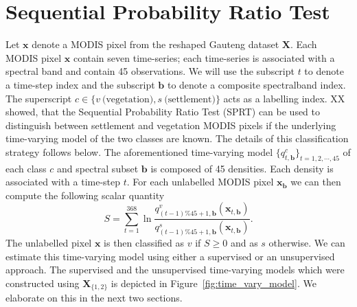 \documentclass{article}
\begin{document}
\section{Sequential Probability Ratio Test}
\label{sec:sprt}
Let $\mathbf{x}$ denote a MODIS pixel from the reshaped Gauteng dataset $\mathbf{X}$. Each MODIS pixel $\mathbf{x}$ contain seven time-series; each time-series is associated with a spectral band and contain 45 observations.
We will use the subscript $t$ to denote a time-step index and the subscript $\mathbf{b}$ to denote a composite spectralband index. The superscript $c\in\{v~\textrm{(vegetation)},s~\textrm{(settlement)}\}$ acts as a labelling index. XX showed, that the Sequential Probability Ratio Test (SPRT) can be used to distinguish between settlement and vegetation MODIS pixels if the underlying time-varying model of the two classes are known. The details of this classification strategy follows below. The aforementioned time-varying model $\{q_{t,\mathbf{b}}^c\}_{t=1,2,\cdots,45}$ of each class $c$ and spectral subset $\mathbf{b}$ is composed of 45 densities. Each density is associated with a time-step $t$. 
For each unlabelled MODIS pixel $\mathbf{x}_{\mathbf{b}}$ we can then compute the following scalar quantity 
\begin{equation}
S = \sum_{t=1}^{368} \ln \frac{q_{(t-1)\%45+1,\mathbf{b}}^v(\mathbf{x}_{t,\mathbf{b}})}{q_{(t-1)\%45+1,\mathbf{b}}^s(\mathbf{x}_{t,\mathbf{b}})}. 
\end{equation}
The unlabelled pixel $\mathbf{x}$ is then classified as $v$ if $S\geq 0$ and as $s$ otherwise. We can estimate this time-varying model using either a supervised or an unsupervised 
approach. The supervised and the unsupervised time-varying models which were constructed using $\mathbf{X}_{\{1,2\}}$ is depicted in Figure~\ref{fig:time_vary_model}. We elaborate on this in the next two sections.
\end{document}
